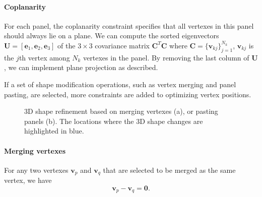 \paragraph{Coplanarity} {For each panel, the coplanarity constraint specifies that all vertexes in this panel should always lie on a plane. 
We can compute the sorted eigenvectors $\mathbf{U} = [\mathbf{e}_1, \mathbf{e}_2, \mathbf{e}_3]$ of the $ 3 \times 3$ covariance matrix $\mathbf{C}^T\mathbf{C}$ where $\mathbf{C} = \{\mathbf{v}_{kj}\}_{j=1}^{N_k}$, $\mathbf{v}_{kj}$ is the $j$th vertex among $N_k$ vertexes in the panel. By removing the last column of $\mathbf{U}$, we can implement plane projection as \cite{Bouaziz:2012:SSD:2346796.2346802} described.


If a set of shape modification operations, such as vertex merging and panel pasting, are selected, more constraints are added to optimizing vertex positions. 
%

\begin{figure}
	\centering
	\caption{3D shape refinement based on merging vertexes (a), or pasting panels (b). The locations where the 3D shape changes are highlighted in blue.  }
	\label{fig:shaperefinement}
\end{figure}

\paragraph{Merging vertexes} 
For any two vertexes $\mathbf{v}_p$ and $\mathbf{v}_q$ that are selected to be merged as the same vertex, we have 
\begin{equation}
\mathbf{v}_p - \mathbf{v}_q = \mathbf{0}.
\label{equ:point}
\end{equation}

}
